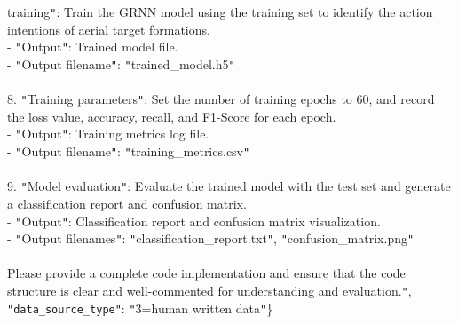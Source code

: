 \begin{tcolorbox}[colback=blue!5!white, colframe=blue!75!black, title=Hard-level Prompt:, text width=\textwidth]
training\texttt{"}: Train the GRNN model using the training set to identify the action intentions of aerial target formations.\\   - \texttt{"}Output\texttt{"}: Trained model file.\\   - \texttt{"}Output filename\texttt{"}: \texttt{"}trained\_model.h5\texttt{"}\\\\8. \texttt{"}Training parameters\texttt{"}: Set the number of training epochs to 60, and record the loss value, accuracy, recall, and F1-Score for each epoch.\\   - \texttt{"}Output\texttt{"}: Training metrics log file.\\   - \texttt{"}Output filename\texttt{"}: \texttt{"}training\_metrics.csv\texttt{"}\\\\9. \texttt{"}Model evaluation\texttt{"}: Evaluate the trained model with the test set and generate a classification report and confusion matrix.\\   - \texttt{"}Output\texttt{"}: Classification report and confusion matrix visualization.\\   - \texttt{"}Output filenames\texttt{"}: \texttt{"}classification\_report.txt\texttt{"}, \texttt{"}confusion\_matrix.png\texttt{"} \\ \\ Please provide a complete code implementation and ensure that the code structure is clear and well-commented for understanding and evaluation.\texttt{"}, \\ \texttt{"data\_source\_type"}: \texttt{"}3=human written data\texttt{"}\}
\end{tcolorbox}
\twocolumn